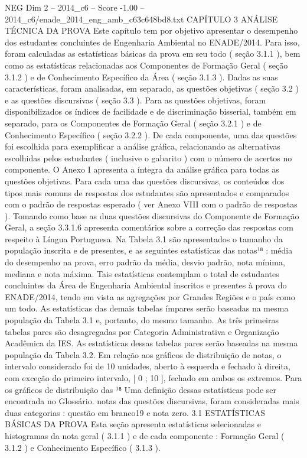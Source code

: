 \begin{textsample}{NEG Dim 2 – 2014\_c6 – Score -1.00 – 2014\_c6/enade\_2014\_eng\_amb\_c63c648bd8.txt}  \label{ex:f2_neg_210}
CAPÍTULO 3 ANÁLISE TÉCNICA DA PROVA Este capítulo tem por objetivo apresentar o desempenho dos estudantes concluintes de Engenharia Ambiental no ENADE/2014.
Para isso, foram calculadas as estatísticas básicas da prova em seu todo ( seção 3.1.1 ), bem como as estatísticas relacionadas aos Componentes de Formação Geral ( seção 3.1.2 ) e de Conhecimento Específico da Área ( seção 3.1.3 ).
Dadas as suas características, foram analisadas, em separado, as questões objetivas ( seção 3.2 ) e as questões discursivas ( seção 3.3 ).
Para as questões objetivas, foram disponibilizados os índices de facilidade e de discriminação bisserial, também em separado, para os Componentes de Formação Geral ( seção 3.2.1 ) e de Conhecimento Específico ( seção 3.2.2 ).
De cada componente, uma das questões foi escolhida para exemplificar a análise gráfica, relacionando as alternativas escolhidas pelos estudantes ( inclusive o gabarito ) com o número de acertos no componente.
O Anexo I apresenta a íntegra da análise gráfica para todas as questões objetivas.
Para cada uma das questões discursivas, os conteúdos dos tipos mais comuns de respostas dos estudantes são apresentados e comparados com o padrão de respostas esperado ( ver Anexo VIII com o padrão de respostas ).
Tomando como base as duas questões discursivas do Componente de Formação Geral, a seção 3.3.1.6 apresenta comentários sobre a correção das respostas com respeito à Língua Portuguesa.
Na Tabela 3.1 são apresentados o tamanho da população inscrita e de presentes, e as seguintes estatísticas das notas¹⁸ : média do desempenho na prova, erro padrão da média, desvio padrão, nota mínima, mediana e nota máxima.
Tais estatísticas contemplam o total de estudantes concluintes da Área de Engenharia Ambiental inscritos e presentes à prova do ENADE/2014, tendo em vista as agregações por Grandes Regiões e o país como um todo.
As estatísticas das demais tabelas ímpares serão baseadas na mesma população da Tabela 3.1 e, portanto, do mesmo tamanho.
As três primeiras tabelas pares são desagregadas por Categoria Administrativa e Organização Acadêmica da IES.
As estatísticas dessas tabelas pares serão baseadas na mesma população da Tabela 3.2.
Em relação aos gráficos de distribuição de notas, o intervalo considerado foi de 10 unidades, aberto à esquerda e fechado à direita, com exceção do primeiro intervalo, [ 0 ; 10 ], fechado em ambos os extremos.
Para os gráficos de distribuição das ¹⁸ Uma definição dessas estatísticas pode ser encontrada no Glossário. notas das questões discursivas, foram consideradas mais duas categorias : questão em branco19 e nota zero. 3.1 ESTATÍSTICAS BÁSICAS DA PROVA Esta seção apresenta estatísticas selecionadas e histogramas da nota geral ( 3.1.1 ) e de cada componente : Formação Geral ( 3.1.2 ) e Conhecimento Específico ( 3.1.3 ).

\end{textsample}
